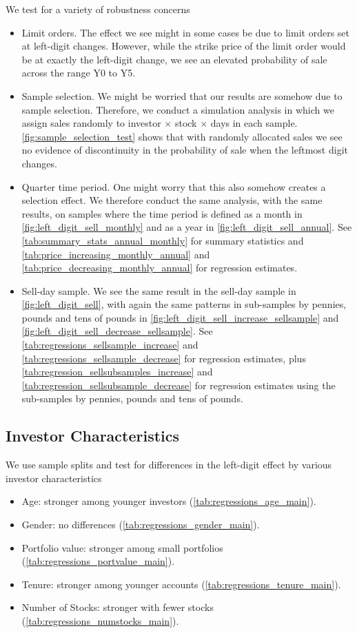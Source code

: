 We test for a variety of robustness concerns
\begin{itemize}
	\item Limit orders. The effect we see might in some cases be due to limit orders set at left-digit changes. However, while the strike price of the limit order would be at exactly the left-digit change, we see an elevated probability of sale across the range Y0 to Y5.
	\item Sample selection. We might be worried that our results are somehow due to sample selection. Therefore, we conduct a simulation analysis in which we assign sales randomly to investor $\times$ stock $\times$ days in each sample. \ref{fig:sample_selection_test} shows that with randomly allocated sales we see no evidence of discontinuity in the probability of sale when the leftmost digit changes.
	\item Quarter time period. One might worry that this also somehow creates a selection effect. We therefore conduct the same analysis, with the same results, on samples where the time period is defined as a month in \ref{fig:left_digit_sell_monthly} and as a year in \ref{fig:left_digit_sell_annual}. See \ref{tab:summary_stats_annual_monthly} for summary statistics and \ref{tab:price_increasing_monthly_annual} and \ref{tab:price_decreasing_monthly_annual} for regression estimates.
	\item Sell-day sample. We see the same result in the sell-day sample in \ref{fig:left_digit_sell}, with again the same patterns in sub-samples by pennies, pounds and tens of pounds in \ref{fig:left_digit_sell_increase_sellsample} and \ref{fig:left_digit_sell_decrease_sellsample}. See \ref{tab:regressions_sellsample_increase} and \ref{tab:regressions_sellsample_decrease} for regression estimates, plus \ref{tab:regression_sellsubsamples_increase} and \ref{tab:regression_sellsubsample_decrease} for regression estimates using the sub-samples by pennies, pounds and tens of pounds.
\end{itemize}

\subsection{Investor Characteristics} 

We use sample splits and test for differences in the left-digit effect by various investor characteristics
\begin{itemize}
	\item Age: stronger among younger investors (\ref{tab:regressions_age_main}).
	\item Gender: no differences (\ref{tab:regressions_gender_main}).
	\item Portfolio value: stronger among small portfolios (\ref{tab:regressions_portvalue_main}).
	\item Tenure: stronger among younger accounts (\ref{tab:regressions_tenure_main}).
	\item Number of Stocks: stronger with fewer stocks (\ref{tab:regressions_numstocks_main}).
\end{itemize}

